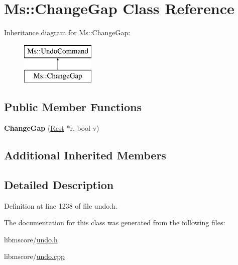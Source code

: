 \hypertarget{class_ms_1_1_change_gap}{}\section{Ms\+:\+:Change\+Gap Class Reference}
\label{class_ms_1_1_change_gap}
Inheritance diagram for Ms\+:\+:Change\+Gap\+:\begin{figure}[H]
\begin{center}
\leavevmode
\includegraphics[height=2.000000cm]{class_ms_1_1_change_gap}
\end{center}
\end{figure}
\subsection*{Public Member Functions}
\begin{DoxyCompactItemize}
\item 
\mbox{\label{class_ms_1_1_change_gap_a360b9d8bdf19017b8fb94dd922b11a94}} 
{\bfseries Change\+Gap} (\hyperlink{class_ms_1_1_rest}{Rest} $\ast$r, bool v)
\end{DoxyCompactItemize}
\subsection*{Additional Inherited Members}


\subsection{Detailed Description}


Definition at line 1238 of file undo.\+h.



The documentation for this class was generated from the following files\+:\begin{DoxyCompactItemize}
\item 
libmscore/\hyperlink{undo_8h}{undo.\+h}\item 
libmscore/\hyperlink{undo_8cpp}{undo.\+cpp}\end{DoxyCompactItemize}
